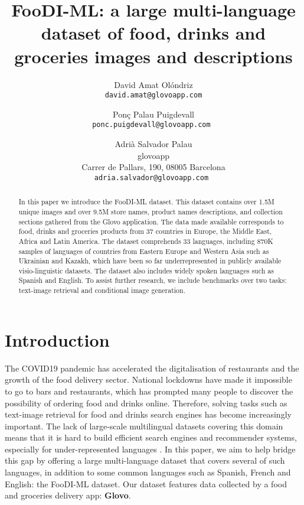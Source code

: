 \documentclass[10pt,twocolumn,letterpaper]{article}
\begin{document}
\title{FooDI-ML: a large multi-language dataset of food, drinks and groceries images and descriptions}

\author{David Amat Olóndriz\\
{\tt\small david.amat@glovoapp.com}
\and
Ponç Palau Puigdevall\\
{\tt\small ponc.puigdevall@glovoapp.com }
\and
Adri\`a Salvador Palau\\
glovoapp\\
Carrer de Pallars, 190, 08005 Barcelona\\
{\tt\small adria.salvador@glovoapp.com  }
}

\maketitle

\begin{abstract}
In this paper we introduce the FooDI-ML dataset. This dataset contains over 1.5M unique images and over 9.5M store names, product names descriptions, and collection sections gathered from the Glovo application. The data made available corresponds to food, drinks and groceries products from 37 countries in Europe, the Middle East, Africa and Latin America. The dataset comprehends 33 languages, including 870K samples of languages of countries from Eastern Europe and Western Asia such as Ukrainian and Kazakh, which have been so far underrepresented in publicly available visio-linguistic datasets. The dataset also includes widely spoken languages such as Spanish and English. To assist further research, we include benchmarks over two tasks: text-image retrieval and conditional image generation.
\end{abstract}

\section{Introduction}
\label{sec:intro}

The COVID19 pandemic has accelerated the digitalisation of restaurants and the growth of the food delivery sector. National lockdowns have made it impossible to go to bars and restaurants, which has prompted many people to discover the possibility of ordering food and drinks online. Therefore, solving tasks such as text-image retrieval for food and drinks search engines has become increasingly important. The lack of large-scale multilingual datasets covering this domain \cite{marin2019recipe1m+} means that it is hard to build efficient search engines and recommender systems, especially for under-represented languages \cite{ramkishoresaravanan_2021}. In this paper, we aim to help bridge this gap by offering a large multi-language dataset that covers several of such languages, in addition to some common languages such as Spanish, French and English: the FooDI-ML dataset. Our dataset features data collected by a food and groceries delivery app: \textbf{Glovo}.
\end{document}
